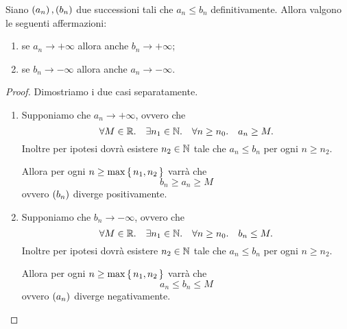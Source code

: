 \begin{theorem}
     \label{th:confr_asint_succ}
    Siano $\seqn*{a}, \seqn*{b}$ due successioni tali che $a_n \leq b_n$ definitivamente.
    Allora valgono le seguenti affermazioni: \begin{enumerate}[label={(\roman*)}, ref={thetheorem: (\roman*)}]
        \item \label{th:confr_succ:a->+inf} se $a_n \to +\infty$ allora anche $b_n \to +\infty$;
        \item \label{th:confr_succ:b->-inf} se $b_n \to -\infty$ allora anche $a_n \to -\infty$.
    \end{enumerate}
\end{theorem}
\begin{proof}
    Dimostriamo i due casi separatamente.
    \begin{enumerate}[label={(\roman*)}]
        \item Supponiamo che $a_n \to +\infty$, ovvero che \[
            \forall M \in \mathbb{R}. \quad \exists n_1 \in \mathbb{N}. \quad \forall n \geq n_0. \quad a_n \geq M. 
        \] Inoltre per ipotesi dovrà esistere $n_2 \in \mathbb{N}$ tale che $a_n \leq b_n$ per ogni $n \geq n_2$.

        Allora per ogni $n \geq \max \left\{\,n_1, n_2\,\right\}$ varrà che \[
            b_n \geq a_n \geq M    
        \] ovvero $\seqn*{b}$ diverge positivamente.
        \item Supponiamo che $b_n \to -\infty$, ovvero che \[
            \forall M \in \mathbb{R}. \quad \exists n_1 \in \mathbb{N}. \quad \forall n \geq n_0. \quad b_n \leq M. 
        \] Inoltre per ipotesi dovrà esistere $n_2 \in \mathbb{N}$ tale che $a_n \leq b_n$ per ogni $n \geq n_2$.

        Allora per ogni $n \geq \max \left\{\,n_1, n_2\,\right\}$ varrà che \[
            a_n \leq b_n \leq M    
        \] ovvero $\seqn*{a}$ diverge negativamente. \qedhere
    \end{enumerate}
\end{proof}

